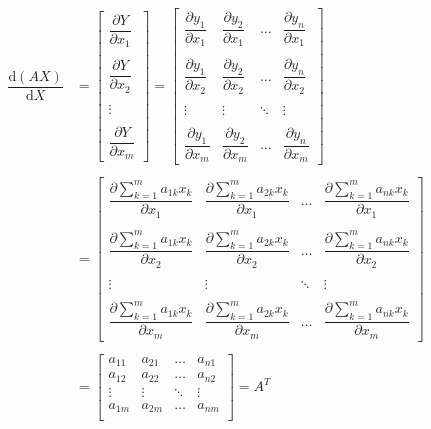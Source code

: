 \documentclass[withoutpreface,bwprint]{cumcmthesis} %
\begin{document}
	\begin{align*}
		\dfrac{\mathrm{d } (AX)}{\mathrm{d} X}&=\left[
			\begin{array}{c}
				\dfrac{\partial Y}{\partial x_1}\\\\
				\dfrac{\partial Y}{\partial x_2}\\\\
				\vdots \\\\
				\dfrac{\partial Y}{\partial x_m}
			\end{array}
		\right]=
		\left[
		\begin{array}{cccc}
			\dfrac{\partial y_1}{\partial x_1} & \dfrac{\partial y_2}{\partial x_1} & \ldots&\dfrac{\partial y_n}{\partial x_1}\\\\
			\dfrac{\partial y_1}{\partial x_2} & \dfrac{\partial y_2}{\partial x_2} & \ldots&\dfrac{\partial y_n}{\partial x_2}\\\\
			\vdots & \vdots &\ddots & \vdots \\\\
			\dfrac{\partial y_1}{\partial x_m} & \dfrac{\partial y_2}{\partial x_m} & \ldots&\dfrac{\partial y_n}{\partial x_m}
		\end{array}
		\right]\\\\
		&=
		\left[
		\begin{array}{cccc}
			\dfrac{\partial \sum_{k=1}^{m}a_{1k}x_k}{\partial x_1} & \dfrac{\partial \sum_{k=1}^{m}a_{2k}x_k}{\partial x_1} & \ldots&\dfrac{\partial \sum_{k=1}^{m}a_{nk}x_k}{\partial x_1}\\\\
			\dfrac{\partial \sum_{k=1}^{m}a_{1k}x_k}{\partial x_2} & \dfrac{\partial \sum_{k=1}^{m}a_{2k}x_k}{\partial x_2} & \ldots&\dfrac{\partial \sum_{k=1}^{m}a_{nk}x_k}{\partial x_2}\\\\
			\vdots & \vdots &\ddots & \vdots \\\\
			\dfrac{\partial \sum_{k=1}^{m}a_{1k}x_k}{\partial x_m} & \dfrac{\partial \sum_{k=1}^{m}a_{2k}x_k}{\partial x_m} & \ldots&\dfrac{\partial \sum_{k=1}^{m}a_{nk}x_k}{\partial x_m}
		\end{array}
		\right]\\\\
		&=\left[
			\begin{array}{cccc}
				a_{11} & a_{21} & \ldots & a_{n1}\\
				a_{12} & a_{22} & \ldots & a_{n2}\\
				\vdots & \vdots &\ddots & \vdots\\
				a_{1m} & a_{2m} & \ldots & a_{nm}\\
			\end{array}
		\right]=A^T
	\end{align*}
\end{document}

